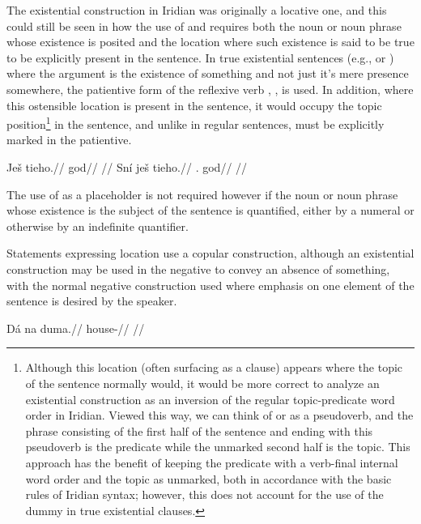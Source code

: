 The existential construction in Iridian was originally a
locative one, and this could still be seen in how the use of
 and  requires both the noun or noun phrase whose existence
is posited and the location where such existence is said to be true to be
explicitly present in the sentence. In true existential sentences (e.g.,
 or ) where the argument is the
existence of something and not just it's mere presence somewhere, the patientive
form of the reflexive verb , , is used. In addition, where this
ostensible location is present in the sentence, it would occupy the
topic position\footnote{Although this location (often surfacing as
a  clause) appears where the topic of the sentence normally would, it
would be more correct to analyze an existential construction as an inversion of
the regular topic-predicate word order in Iridian. Viewed this way, we can think
of  or  as a pseudoverb, and the phrase consisting of the
first half of the sentence and ending with this pseudoverb is the predicate
while the unmarked second half is the topic. This approach has the benefit of
keeping the predicate with a verb-final internal word order and the topic as
unmarked, both in accordance with the basic rules of Iridian syntax; however,
this does not account for the use of the dummy  in true existential
clauses.} in the sentence, and unlike in regular sentences, must be explicitly
marked in the patientive.


\begin{multicols}{2}
\pex
\a\begingl
\gla \ljudge{*}Ješ tieho.//
\glb \Exst{} god//
\glft {}//
\endgl
\a\begingl
\gla Sní ješ tieho.//
\glb \Refl{}.\Acc{} \Exst{} god//
\glft {}//
\endgl
\xe
\end{multicols}

The use of  as a placeholder is not required however if the noun or
noun phrase whose existence is the subject of the sentence is quantified, either
by a numeral or otherwise by an indefinite quantifier.

Statements expressing location use a copular construction, although an
existential construction may be used in the negative to convey an absence of
something, with the normal negative construction used where emphasis on one
element of the sentence is desired by the speaker.

\pex
\begingl
\gla Dá na duma.//
\glb \First{}\Sg{} \Loc{} house-\Acc{}//
\glft {}//
\endgl
\xe

